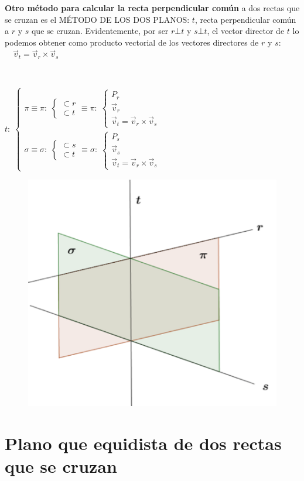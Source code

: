 \textbf{Otro método para calcular la recta perpendicular común} a dos rectas que se cruzan es el MÉTODO DE LOS DOS PLANOS: $t$, recta perpendicular común a $r$ y $s$ que se cruzan. Evidentemente, por ser $r\bot t$ y $s \bot t$, el vector director de $t$ lo podemos obtener como producto vectorial de los vectores directores de $r$ y $s$: $\quad \vec v_t=\vec v_r \times \vec v_s$

\begin{multicols}{2}

$\quad$

\noindent \footnotesize{$t:\; \begin{cases}
 \pi     \equiv    \pi:\;  \begin{cases} \subset r \\ \subset t   \end{cases} \equiv \pi:\; \begin{cases} P_r \\ \vec v_r \\ \vec v_t=\vec v_r \times \vec v_s \end{cases}
 \\
 \sigma	 \equiv \sigma:\;  \begin{cases} \subset s \\ \subset t   \end{cases} \equiv \sigma:\; \begin{cases} P_s \\ \vec v_s \\ \vec v_t=\vec v_r \times \vec v_s \end{cases}
 \end{cases}$}

 \begin{figure}[H]
		\centering
		\includegraphics[width=.4\textwidth]{imagenes/imagenes11/T11IM17.png}
	\end{figure}
\end{multicols}


\section[Plano que equidista de dos rectas que se cruzan]
{Plano que equidista de dos rectas que se cruzan}

